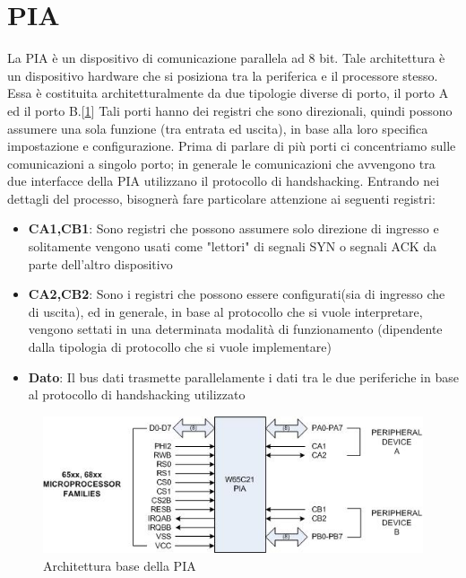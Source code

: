 \section{PIA}
La PIA è un dispositivo di comunicazione parallela ad 8 bit. Tale architettura è un dispositivo hardware che si posiziona tra la periferica e il processore stesso. Essa è costituita architetturalmente da due tipologie diverse di porto, il porto A ed il porto B.[\ref{img:PIA}]
Tali porti hanno dei registri che sono direzionali, quindi possono assumere una sola funzione (tra entrata ed uscita), in base alla loro specifica impostazione e configurazione.
Prima di parlare di più porti ci concentriamo sulle comunicazioni a singolo porto; in generale le comunicazioni che avvengono tra due interfacce della PIA utilizzano il protocollo di handshacking. Entrando nei dettagli del processo, bisognerà fare particolare attenzione ai seguenti registri:
\begin{itemize}
    \item \textbf{CA1,CB1}: Sono registri che possono assumere solo direzione di ingresso e solitamente vengono usati come "lettori" di segnali SYN o segnali ACK da parte dell'altro dispositivo
    \item \textbf{CA2,CB2}: Sono i registri che possono essere configurati(sia di ingresso che di uscita), ed in generale, in base al protocollo che si vuole interpretare, vengono settati in una determinata modalità di funzionamento (dipendente dalla tipologia di protocollo che si vuole implementare)
    \item \textbf{Dato}: Il bus dati trasmette parallelamente i dati tra le due periferiche in base al protocollo di handshacking utilizzato
\end{itemize}

\begin{figure}
    \centering
    \includegraphics[width=.6\textwidth]{img/PIA.png}
    \caption{Architettura base della PIA}\label{img:PIA}
\end{figure}



